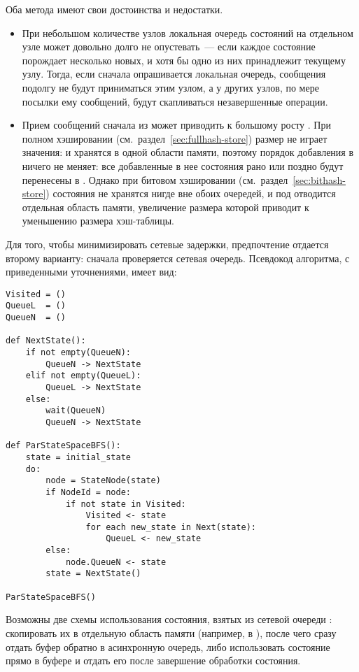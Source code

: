 Оба метода имеют свои достоинства и недостатки.
\begin{itemize}
\item При небольшом количестве узлов локальная очередь состояний на отдельном узле может
  довольно долго не опустевать~--- если каждое состояние порождает несколько новых, и хотя
  бы одно из них принадлежит текущему узлу. Тогда, если сначала опрашивается локальная
  очередь, сообщения подолгу не будут приниматься этим узлом, а у других узлов, по мере
  посылки ему сообщений, будут скапливаться незавершенные операции.
\item Прием сообщений сначала из  может приводить к большому росту
  . При полном хэшировании (см.~раздел~\ref{sec:fullhash-store}) размер
   не играет значения:  и  хранятся в одной
  области памяти, поэтому порядок добавления в  ничего не меняет: все
  добавленные в нее состояния рано или поздно будут перенесены в . Однако
  при битовом хэшировании (см.~раздел~\ref{sec:bithash-store}) состояния не хранятся нигде
  вне обоих очередей, и под  отводится отдельная область памяти,
  увеличение размера которой приводит к уменьшению размера хэш-таблицы.
\end{itemize}

Для того, чтобы минимизировать сетевые задержки, предпочтение отдается второму варианту:
сначала проверяется сетевая очередь. Псевдокод алгоритма, с приведенными уточнениями,
имеет вид:

\begin{lstlisting}[style=pseudocode]
Visited = ()
QueueL  = ()
QueueN  = ()

def NextState():
    if not empty(QueueN):
        QueueN -> NextState
    elif not empty(QueueL):
        QueueL -> NextState
    else:
        wait(QueueN)
        QueueN -> NextState

def ParStateSpaceBFS():
    state = initial_state
    do:
        node = StateNode(state)
        if NodeId = node:
            if not state in Visited:
                Visited <- state
                for each new_state in Next(state):
                    QueueL <- new_state
        else:
            node.QueueN <- state
        state = NextState()

ParStateSpaceBFS()
\end{lstlisting}

Возможны две схемы использования состояния, взятых из сетевой очереди :
скопировать их в отдельную область памяти (например, в ), после чего сразу
отдать буфер обратно в асинхронную очередь, либо использовать состояние прямо в буфере и
отдать его после завершение обработки состояния. 


